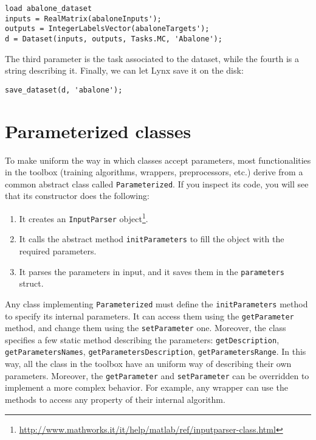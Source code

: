 \begin{lstlisting}
load abalone_dataset
inputs = RealMatrix(abaloneInputs');
outputs = IntegerLabelsVector(abaloneTargets');
d = Dataset(inputs, outputs, Tasks.MC, 'Abalone');
\end{lstlisting} 

\noindent The third parameter is the task associated to the dataset, while the fourth is a string describing it. Finally, we can let Lynx save it on the disk:

\begin{lstlisting}
save_dataset(d, 'abalone');
\end{lstlisting}

\section{Parameterized classes}
\label{sec:parameterizedclasses}

To make uniform the way in which classes accept parameters, most functionalities in the toolbox (training algorithms, wrappers, preprocessors, etc.) derive from a common abstract class called \verb|Parameterized|. If you inspect its code, you will see that its constructor does the following:

\begin{enumerate}
\item It creates an \verb|InputParser| object\footnote{\url{http://www.mathworks.it/it/help/matlab/ref/inputparser-class.html}}.
\item It calls the abstract method \verb|initParameters| to fill the object with the required parameters.
\item It parses the parameters in input, and it saves them in the \verb|parameters| struct.
\end{enumerate}

\noindent Any class implementing \verb|Parameterized| must define the \verb|initParameters| method to specify its internal parameters. It can access them using the \verb|getParameter| method, and change them using the \verb|setParameter| one. Moreover, the class specifies a few static method describing the parameters: \verb|getDescription|, \verb|getParametersNames|, \verb|getParametersDescription|, \verb|getParametersRange|. In this way, all the class in the toolbox have an uniform way of describing their own parameters. Moreover, the \verb|getParameter| and \verb|setParameter| can be overridden to implement a more complex behavior. For example, any wrapper can use the methods to access any property of their internal algorithm.

